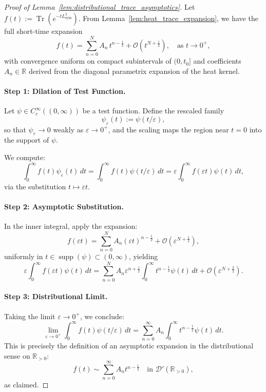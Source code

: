\begin{proof}[Proof of Lemma~\ref{lem:distributional_trace_asymptotics}]
Let \( f(t) := \operatorname{Tr}(e^{-t L_{\mathrm{sym}}^2}) \). From Lemma~\ref{lem:heat_trace_expansion}, we have the full short-time expansion
\[
f(t) = \sum_{n=0}^N A_n \, t^{n - \frac{1}{2}} + \mathcal{O}(t^{N + \frac{1}{2}}), \quad \text{as } t \to 0^+,
\]
with convergence uniform on compact subintervals of \( (0, t_0] \) and coefficients \( A_n \in \mathbb{R} \) derived from the diagonal parametrix expansion of the heat kernel.

\paragraph{Step 1: Dilation of Test Function.}
Let \( \psi \in C_c^\infty((0, \infty)) \) be a test function. Define the rescaled family
\[
\psi_\varepsilon(t) := \psi(t/\varepsilon),
\]
so that \( \psi_\varepsilon \to 0 \) weakly as \( \varepsilon \to 0^+ \), and the scaling maps the region near \( t = 0 \) into the support of \( \psi \).

We compute:
\[
\int_0^\infty f(t) \psi_\varepsilon(t)\, dt
= \int_0^\infty f(t) \psi(t/\varepsilon)\, dt
= \varepsilon \int_0^\infty f(\varepsilon t) \psi(t)\, dt,
\]
via the substitution \( t \mapsto \varepsilon t \).

\paragraph{Step 2: Asymptotic Substitution.}
In the inner integral, apply the expansion:
\[
f(\varepsilon t) = \sum_{n=0}^N A_n (\varepsilon t)^{n - \frac{1}{2}} + \mathcal{O}(\varepsilon^{N + \frac{1}{2}}),
\]
uniformly in \( t \in \operatorname{supp}(\psi) \subset (0, \infty) \), yielding
\[
\varepsilon \int_0^\infty f(\varepsilon t) \psi(t)\, dt
= \sum_{n=0}^N A_n \varepsilon^{n + \frac{1}{2}} \int_0^\infty t^{n - \frac{1}{2}} \psi(t)\, dt + \mathcal{O}(\varepsilon^{N + \frac{3}{2}}).
\]

\paragraph{Step 3: Distributional Limit.}
Taking the limit \( \varepsilon \to 0^+ \), we conclude:
\[
\lim_{\varepsilon \to 0^+} \int_0^\infty f(t) \psi(t/\varepsilon)\, dt
= \sum_{n=0}^\infty A_n \int_0^\infty t^{n - \frac{1}{2}} \psi(t)\, dt.
\]
This is precisely the definition of an asymptotic expansion in the distributional sense on \( \mathbb{R}_{>0} \):
\[
f(t) \sim \sum_{n=0}^\infty A_n t^{n - \frac{1}{2}} \quad \text{in } \mathcal{D}'(\mathbb{R}_{>0}),
\]
as claimed.
\end{proof}
